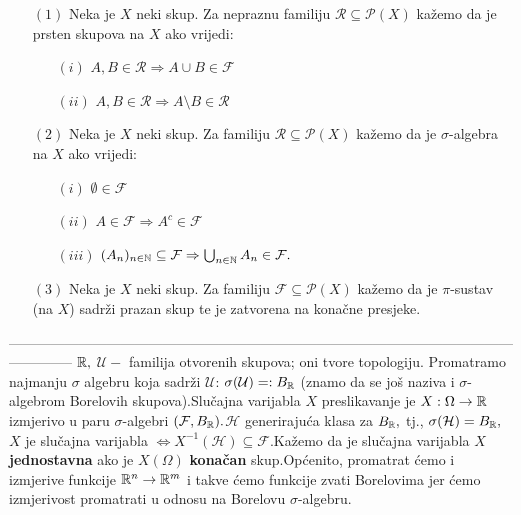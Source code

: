 \documentclass{article}
\begin{document}
\begin{enumerate}
    \item[\((1)\)] Neka je \(X\) neki skup. Za nepraznu familiju \(\mathcal R\subseteq\mathcal P(X)\) kažemo da je prsten skupova na \(X\) ako vrijedi:\begin{itemize}
        \item[\((i)\)] \(A,B\in\mathcal R\Rightarrow A\cup B\in\mathcal F\)
        \item[\((ii)\)] \(A,B\in\mathcal R\Rightarrow A\setminus B\in\mathcal R\)
    \end{itemize}
    \item[\((2)\)] Neka je \(X\) neki skup. Za familiju \(\mathcal R\subseteq\mathcal P(X)\) kažemo da je \(\sigma\)-algebra na \(X\) ako vrijedi:\begin{itemize}
        \item[\((i)\)] \(\emptyset\in\mathcal F\)
        \item[\((ii)\)] \(A\in\mathcal F\Rightarrow A^c\in\mathcal F\)
        \item[\((iii)\)] \((A_n)_{n\in\Bbb N}\subseteq\mathcal F\Rightarrow\bigcup_{n\in\Bbb N}A_n\in\mathcal F.\)
    \end{itemize}
    \item[\((3)\)] Neka je \(X\) neki skup. Za familiju \(\mathcal F\subseteq\mathcal P(X)\) kažemo da je \(\pi\)-sustav (na \(X\)) sadrži prazan skup te je zatvorena na konačne presjeke.
\end{enumerate}
--------------------------------------------------------------------------------------------------------------------------\newline\newline
\(\Bbb R,\) \(\mathcal U-\) familija otvorenih skupova; oni tvore topologiju. Promatramo najmanju \(\sigma\) algebru koja sadrži \(\mathcal U\): \(\sigma(\mathcal U)=:B_{\Bbb R}\) (znamo da se još naziva i \(\sigma\)-algebrom Borelovih skupova).\newline Slučajna varijabla \(X\) preslikavanje je \(X:\Omega\to\Bbb R\) izmjerivo u paru \(\sigma\)-algebri \((\mathcal F,B_{\Bbb R}).\)\newline \(\mathcal H\) generirajuća klasa za \(B_{\Bbb R},\) tj., \(\sigma(\mathcal H)=B_{\Bbb R},\) \(X\) je slučajna varijabla \(\Leftrightarrow X^{-1}(\mathcal H)\subseteq\mathcal F.\)\newline Kažemo da je slučajna varijabla \(X\) \textbf{jednostavna} ako je \(X(\Omega)\) \textbf{konačan} skup.\newline Općenito, promatrat ćemo i izmjerive funkcije \(\Bbb R^n\to\Bbb R^m\) i takve ćemo funkcije zvati Borelovima jer ćemo izmjerivost promatrati u odnosu na Borelovu \(\sigma\)-algebru.\newline 
\end{document}
